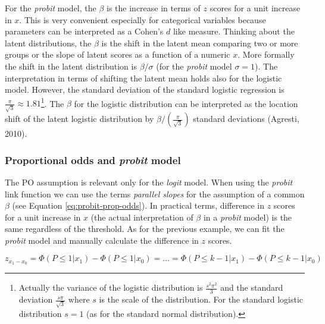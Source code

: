 \documentclass[
  man,floatsintext]{apa6}
\begin{document}
For the \emph{probit} model, the \(\beta\) is the increase in terms of \(z\) scores for a unit increase in \(x\). This is very convenient especially for categorical variables because parameters can be interpreted as a Cohen's \(d\) like measure. Thinking about the latent distributions, the \(\beta\) is the shift in the latent mean comparing two or more groups or the slope of latent scores as a function of a numeric \(x\). More formally the shift in the latent distribution is \(\beta/\sigma\) (for the \emph{probit} model \(\sigma = 1\)). The interpretation in terms of shifting the latent mean holds also for the logistic model. However, the standard deviation of the standard logistic regression is \(\frac{\pi}{\sqrt{3}} \approx 1.81\)\footnote{Actually the variance of the logistic distribution is \(\frac{s^2\pi^2}{3}\) and the standard deviation \(\frac{s\pi}{\sqrt{3}}\) where \(s\) is the scale of the distribution. For the standard logistic distribution \(s = 1\) (as for the standard normal distribution).}. The \(\beta\) for the logistic distribution can be interpreted as the location shift of the latent logistic distribution by \(\beta/(\frac{\pi}{\sqrt{3}})\) standard deviations (Agresti, 2010).

\subsubsection{\texorpdfstring{Proportional odds and \emph{probit} model}{Proportional odds and probit model}}\label{proportional-odds-and-probit-model}

The PO assumption is relevant only for the \emph{logit} model. When using the \emph{probit} link function we can use the terms \emph{parallel slopes} for the assumption of a common \(\beta\) (see Equation \eqref{eq:probit-prop-odds}). In practical terms, difference in \(z\) scores for a unit increase in \(x\) (the actual interpretation of \(\beta\) in a \emph{probit} model) is the same regardless of the threshold. As for the previous example, we can fit the \emph{probit} model and manually calculate the difference in \(z\) scores.

\begin{equation}
z_{x_1 - x_0} = \Phi(P \leq 1|x_1) - \Phi(P \leq 1|x_0) = \dots = \Phi(P \leq k - 1|x_1) - \Phi(P \leq k - 1|x_0)
\label{eq:probit-prop-odds}
\end{equation}

\scriptsize
\end{document}

